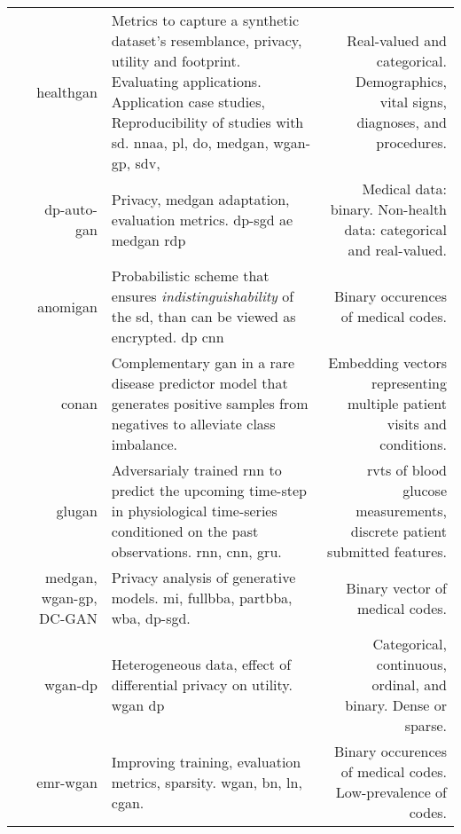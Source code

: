 \begin{center}
\begin{longtable}[l]{@{}p{}NMR@{}}
        \citeauthor{Yale_2020} & \gls{healthgan}
        & Metrics to capture a synthetic dataset’s resemblance, privacy, utility and footprint. Evaluating applications. Application case studies, Reproducibility of studies with \gls{sd}.  \gls{nnaa}, \gls{pl}, \gls{do}, \gls{medgan}, \gls{wgan-gp}, \gls{sdv}, 
        & Real-valued and categorical. Demographics, vital signs, diagnoses, and procedures.\\
        
        \citeauthor{tanti2019} & \gls{dp-auto-gan}
        & Privacy, \gls{medgan} adaptation, evaluation metrics.  \gls{dp-sgd} \gls{ae} \gls{medgan} \gls{rdp}
        & Medical data: binary. Non-health data: categorical and real-valued.\\
        
        \citeauthor{BaeAnomiGAN2020} & \gls{anomigan}
        & Probabilistic scheme that ensures \textit{indistinguishability} of the \gls{sd}, than can be viewed as encrypted.  \gls{dp} \gls{cnn}
        & Binary occurences of medical codes.\\
        
        \citeauthor{cui2019conan} & \gls{conan}
        & Complementary \gls{gan} in a rare disease predictor model that generates positive samples from negatives to alleviate class imbalance.
        & Embedding vectors representing multiple patient visits and conditions.\\
        
        \citeauthor{zhu_2020} & \gls{glugan}
        & Adversarialy trained \gls{rnn} to predict the upcoming time-step in physiological time-series conditioned on the past observations.  \gls{rnn}, \gls{cnn}, \gls{gru}.
        & \Gls{rvts} of blood glucose measurements, discrete patient submitted features.\\
        
        \citeauthor{chen2019ganleaks} & \gls{medgan}, \gls{wgan-gp}, DC-GAN
        & Privacy analysis of generative models.   \gls{mi}, \gls{fullbba}, \gls{partbba}, \gls{wba}, \gls{dp-sgd}.
        & Binary vector of medical codes.\\
        
        \citeauthor{chincheong2020generation} & \gls{wgan-dp}
        & Heterogeneous data, effect of differential privacy on utility.   \gls{wgan} \gls{dp}
        & Categorical, continuous,  ordinal, and binary. Dense or sparse.\\
        
        \citeauthor{Zhang2020} & \gls{emr-wgan}
        & Improving training, evaluation metrics, sparsity.  \gls{wgan}, \gls{bn}, \gls{ln}, \gls{cgan}.
        & Binary occurences of medical codes. Low-prevalence of codes. \\
        

\end{longtable}
\end{center}
